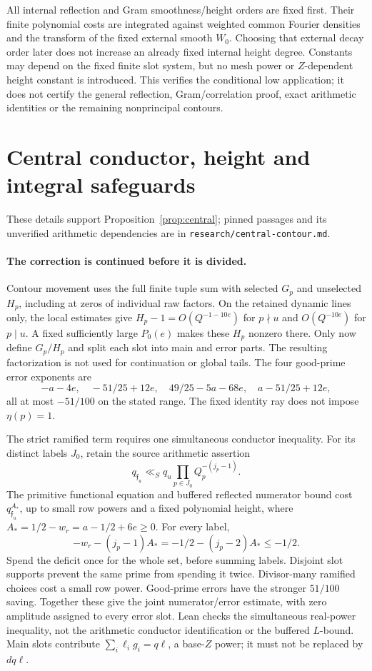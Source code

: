 All internal reflection and Gram smoothness/height orders are fixed first.
Their finite polynomial costs are integrated against weighted common
Fourier densities and the transform of the fixed external smooth
$W_0$. Choosing that external decay order later does not increase an
already fixed internal height degree. Constants may depend on the
fixed finite slot system, but no mesh power or $Z$-dependent height
constant is introduced. This verifies the conditional low application;
it does not certify the general reflection, Gram/correlation proof,
exact arithmetic identities or the remaining nonprincipal contours.


\section{Central conductor, height and integral safeguards}
These details support Proposition~\ref{prop:central}; pinned passages and
its unverified arithmetic dependencies are in
\texttt{research/central-contour.md}.

\paragraph{The correction is continued before it is divided.}
Contour movement uses the full finite tuple sum with selected $G_p$
and unselected $H_p$, including at zeros of individual raw factors.
On the retained dynamic lines only, the local estimates give
$H_p-1=O(Q^{-1-10e})$ for $p\nmid u$ and $O(Q^{-10e})$ for $p\mid u$.
A fixed sufficiently large $P_0(e)$ makes these $H_p$ nonzero there.
Only now define $G_p/H_p$ and split each slot into main and error parts.
The resulting factorization is not used for continuation or global tails.
The four good-prime error exponents are
\[
 -a-4e,\quad-51/25+12e,\quad49/25-5a-68e,\quad a-51/25+12e,
\]
all at most $-51/100$ on the stated range.
The fixed identity ray does not impose $\eta(p)=1$.

The strict ramified term requires one simultaneous conductor inequality.
For its distinct labels $J_0$, retain the source arithmetic assertion
\[
 q_{\mathfrak f_u}\ll_S q_u\prod_{p\in J_0}Q_p^{-(j_p-1)}.
\]
The primitive functional equation and buffered reflected numerator bound
cost $q_{\mathfrak f_u}^{A_*}$, up to small row powers and a fixed
polynomial height, where $A_*=1/2-w_r=a-1/2+6e\ge0$.
For every label,
\[
 -w_r-(j_p-1)A_*=-1/2-(j_p-2)A_*\le-1/2.
\]
Spend the deficit once for the whole set, before summing labels.
Disjoint slot supports prevent the same prime from spending it twice.
Divisor-many ramified choices cost a small row power. Good-prime errors
have the stronger $51/100$ saving. Together these give the joint
numerator/error estimate, with zero amplitude assigned to every error
slot. Lean checks the simultaneous real-power inequality, not the
arithmetic conductor identification or the buffered $L$-bound.
Main slots contribute $\sum_i\ell_i g_i=q\ell$, a base-$Z$ power;
it must not be replaced by $dq\ell$.

